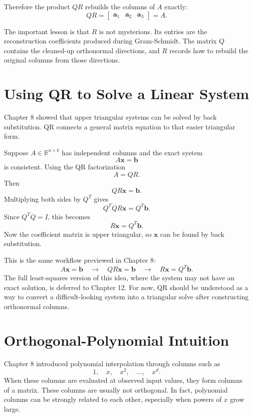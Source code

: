 Therefore the product \(QR\) rebuilds the columns of \(A\) exactly:
\[
    QR=
    \begin{bmatrix}
        \mathbf{a}_1 & \mathbf{a}_2 & \mathbf{a}_3
    \end{bmatrix}
    =A.
\]

The important lesson is that \(R\) is not mysterious. Its entries are the reconstruction coefficients produced during Gram-Schmidt. The matrix \(Q\) contains the cleaned-up orthonormal directions, and \(R\) records how to rebuild the original columns from those directions.

\section{Using QR to Solve a Linear System}
\label{mf:qr-triangular-solve}

Chapter 8 showed that upper triangular systems can be solved by back substitution. QR connects a general matrix equation to that easier triangular form.

Suppose \(A\in\mathbb{R}^{n\times k}\) has independent columns and the exact system
\[
    A\mathbf{x}=\mathbf{b}
\]
is consistent. Using the QR factorization
\[
    A=QR.
\]
Then
\[
    QR\mathbf{x}=\mathbf{b}.
\]
Multiplying both sides by \(Q^T\) gives
\[
    Q^TQR\mathbf{x}=Q^T\mathbf{b}.
\]
Since \(Q^TQ=I\), this becomes
\[
    R\mathbf{x}=Q^T\mathbf{b}.
\]
Now the coefficient matrix is upper triangular, so \(\mathbf{x}\) can be found by back substitution.

This is the same workflow previewed in Chapter 8:
\[
    A\mathbf{x}=\mathbf{b}
    \quad\longrightarrow\quad
    QR\mathbf{x}=\mathbf{b}
    \quad\longrightarrow\quad
    R\mathbf{x}=Q^T\mathbf{b}.
\]
The full least-squares version of this idea, where the system may not have an exact solution, is deferred to Chapter 12. For now, QR should be understood as a way to convert a difficult-looking system into a triangular solve after constructing orthonormal columns.

\section{Orthogonal-Polynomial Intuition}
\label{mf:orthogonal-polynomials}

Chapter 8 introduced polynomial interpolation through columns such as
\[
    1,
    \quad x,
    \quad x^2,
    \quad \ldots,
    \quad x^{d}.
\]
When these columns are evaluated at observed input values, they form columns of a matrix. These columns are usually not orthogonal. In fact, polynomial columns can be strongly related to each other, especially when powers of \(x\) grow large.

